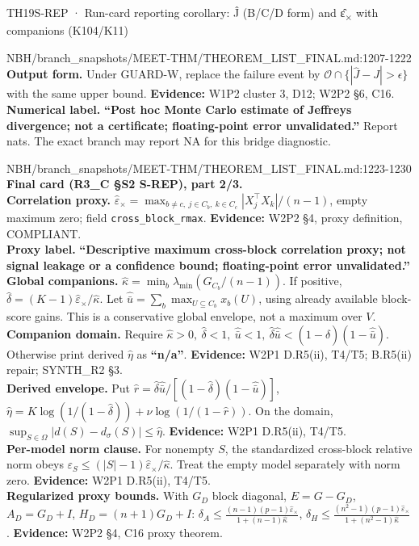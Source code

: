 \begin{card}{TH19}{S-REP · Run-card reporting corollary: Ĵ (B/C/D form) and ε̂\textsubscript{×} with companions (K104/K11)}
\begin{stmt}{NBH/branch_snapshots/MEET-THM/THEOREM_LIST_FINAL.md:1207-1222}
\textbf{Output form.} Under GUARD-W, replace the failure event by $\mathcal O\cap\{|\widehat J-J|>\epsilon\}$ with the same upper bound. \textbf{Evidence:} W1P2 cluster 3, D12; W2P2 §6, C16.\\
\textbf{Numerical label.} \textbf{“Post hoc Monte Carlo estimate of Jeffreys divergence; not a certificate; floating-point error unvalidated.”} Report nats. The exact branch may report NA for this bridge diagnostic.
\end{stmt}

\begin{stmt}{NBH/branch_snapshots/MEET-THM/THEOREM_LIST_FINAL.md:1223-1230}
\textbf{Final card (R3\_C §S2 S-REP), part 2/3.}\\
\textbf{Correlation proxy.} $\displaystyle\widehat\varepsilon_\times=\max_{b\ne c,\ j\in C_b,\ k\in C_c}|X_j^\top X_k|/(n-1)$, empty maximum zero; field \texttt{cross\_block\_rmax}. \textbf{Evidence:} W2P2 §4, proxy definition, COMPLIANT.\\
\textbf{Proxy label.} \textbf{“Descriptive maximum cross-block correlation proxy; not signal leakage or a confidence bound; floating-point error unvalidated.”}\\
\textbf{Global companions.} $\widehat\kappa=\min_b\lambda_{\min}(G_{C_b}/(n-1))$. If positive, $\widehat\delta=(K-1)\widehat\varepsilon_\times/\widehat\kappa$. Let $\widehat{\bar u}=\sum_b\max_{U\subseteq C_b}x_b(U)$, using already available block-score gains. This is a conservative global envelope, not a maximum over $V$.\\
\textbf{Companion domain.} Require $\widehat\kappa>0,\ \widehat\delta<1,\ \widehat{\bar u}<1,\ \widehat\delta\widehat{\bar u}<(1-\widehat\delta)(1-\widehat{\bar u})$. Otherwise print derived $\widehat\eta$ as \textbf{“n/a”}. \textbf{Evidence:} W2P1 D.R5(ii), T4/T5; B.R5(ii) repair; SYNTH\_R2 §3.\\
\textbf{Derived envelope.} Put $\widehat r=\widehat\delta\widehat{\bar u}/[(1-\widehat\delta)(1-\widehat{\bar u})]$, $\widehat\eta=K\log(1/(1-\widehat\delta))+\nu\log(1/(1-\widehat r))$. On the domain, $\sup_{S\in\Omega}|d(S)-d_\sigma(S)|\le\widehat\eta$. \textbf{Evidence:} W2P1 D.R5(ii), T4/T5.\\
\textbf{Per-model norm clause.} For nonempty $S$, the standardized cross-block relative norm obeys $\varepsilon_S\le(|S|-1)\widehat\varepsilon_\times/\widehat\kappa$. Treat the empty model separately with norm zero. \textbf{Evidence:} W2P1 D.R5(ii), T4/T5.\\
\textbf{Regularized proxy bounds.} With $G_D$ block diagonal, $E=G-G_D$, $A_D=G_D+I$, $H_D=(n+1)G_D+I$: $\delta_A\le\frac{(n-1)(p-1)\widehat\varepsilon_\times}{1+(n-1)\widehat\kappa}$, $\delta_H\le\frac{(n^2-1)(p-1)\widehat\varepsilon_\times}{1+(n^2-1)\widehat\kappa}$. \textbf{Evidence:} W2P2 §4, C16 proxy theorem.\\

\end{stmt}
\end{card}

